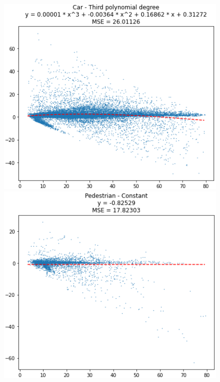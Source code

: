 \begin{figure}[H]
	\begin{minipage}{0.32\textwidth}
		\centering
		\includegraphics[width=1\linewidth]{Book/figures/6_approx_distancia/rectification_lidar_car.png}
	\end{minipage}\hfill
	\begin{minipage}{0.32\textwidth}
		\centering
		\includegraphics[width=1\linewidth]{Book/figures/6_approx_distancia/rectification_lidar_pedestrian.png}

\end{minipage}
\end{figure}
